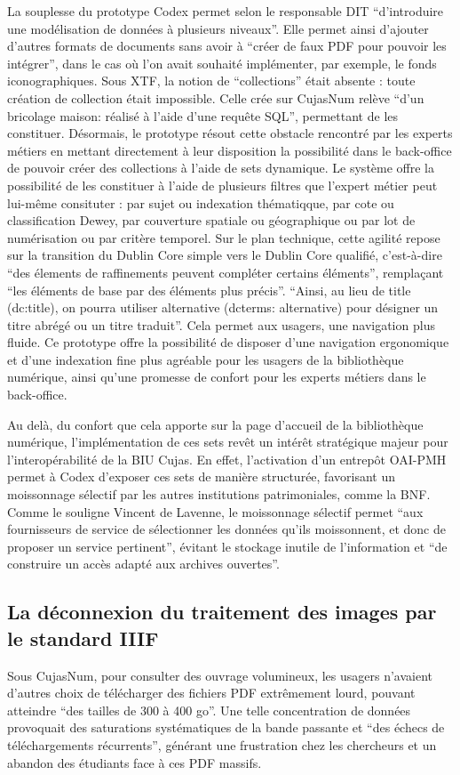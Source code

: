 La souplesse du prototype Codex permet selon le responsable DIT \enquote{d'introduire une modélisation de données à plusieurs niveaux}. Elle permet ainsi d'ajouter d'autres formats de documents sans avoir à \enquote{créer de faux PDF pour pouvoir les intégrer}, dans le cas où l'on avait souhaité implémenter, par exemple, le fonds iconographiques. Sous XTF, la notion de \enquote{collections} était absente : toute création de collection était impossible. Celle crée sur CujasNum relève \enquote{d'un bricolage maison: réalisé à l'aide d'une requête SQL}, permettant de les constituer. Désormais, le prototype résout cette obstacle rencontré par les experts métiers en mettant directement à leur disposition la possibilité dans le back-office de pouvoir créer des collections à l'aide de sets dynamique. Le système offre la possibilité de les constituer à l'aide de plusieurs filtres que l'expert métier peut lui-même consituter : par sujet ou indexation thématiqque, par cote ou classification Dewey, par couverture spatiale ou géographique ou par lot de numérisation ou par critère temporel. Sur le plan technique, cette agilité repose sur la transition du Dublin Core simple vers le Dublin Core qualifié, c'est-à-dire \enquote{des élements de raffinements peuvent compléter certains éléments}, remplaçant \enquote{les éléments de base par des éléments plus précis}. \enquote{Ainsi, au lieu de title (dc:title), on pourra utiliser alternative (dcterms: alternative) pour désigner un titre abrégé ou un titre traduit}. Cela permet aux usagers, une navigation plus fluide. Ce prototype offre la possibilité de disposer d'une navigation ergonomique et d'une indexation fine plus agréable pour les usagers de la bibliothèque numérique, ainsi qu'une promesse de confort pour les experts métiers dans le back-office.

Au delà, du confort que cela apporte sur la page d'accueil de la bibliothèque numérique, l'implémentation de ces sets revêt un intérêt stratégique majeur pour l'interopérabilité de la BIU Cujas. En effet, l'activation d'un entrepôt OAI-PMH permet à Codex d'exposer ces sets de manière structurée, favorisant un moissonnage sélectif par les autres institutions patrimoniales, comme la BNF. Comme le souligne Vincent de Lavenne, le moissonnage sélectif permet \enquote{aux fournisseurs de service de sélectionner les données qu'ils moissonnent, et donc de proposer un service pertinent}, évitant le stockage inutile de l'information et \enquote{de construire un accès adapté aux archives ouvertes}. 

\subsection{La déconnexion du traitement des images par le standard IIIF}
Sous CujasNum, pour consulter des ouvrage volumineux, les usagers n'avaient d'autres choix de télécharger des fichiers PDF extrêmement lourd, pouvant atteindre \enquote{des tailles de 300 à 400 go}. Une telle concentration de données provoquait des saturations systématiques de la bande passante et \enquote{des échecs de téléchargements récurrents}, générant une frustration chez les chercheurs et un abandon des étudiants face à ces PDF massifs. 

